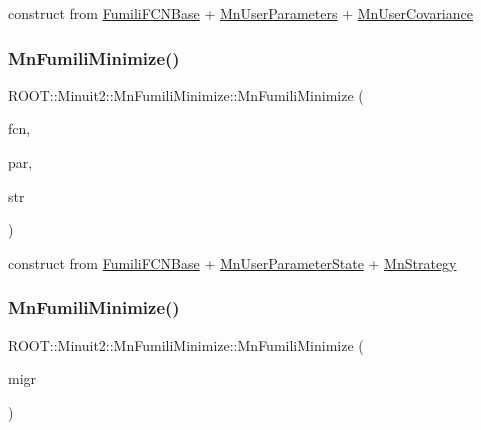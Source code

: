 construct from \mbox{\hyperlink{classROOT_1_1Minuit2_1_1FumiliFCNBase}{Fumili\+F\+C\+N\+Base}} + \mbox{\hyperlink{classROOT_1_1Minuit2_1_1MnUserParameters}{Mn\+User\+Parameters}} + \mbox{\hyperlink{classROOT_1_1Minuit2_1_1MnUserCovariance}{Mn\+User\+Covariance}} 

\mbox{\label{classROOT_1_1Minuit2_1_1MnFumiliMinimize_ad8292150eb4f2642fb583f0cec00ed7b}} 
\subsubsection{\texorpdfstring{MnFumiliMinimize()}{MnFumiliMinimize()}\hspace{0.1cm}{\footnotesize\ttfamily [6/14]}}
{\footnotesize\ttfamily R\+O\+O\+T\+::\+Minuit2\+::\+Mn\+Fumili\+Minimize\+::\+Mn\+Fumili\+Minimize (\begin{DoxyParamCaption}\item[{const \mbox{\hyperlink{classROOT_1_1Minuit2_1_1FumiliFCNBase}{Fumili\+F\+C\+N\+Base}} \&}]{fcn,  }\item[{const \mbox{\hyperlink{classROOT_1_1Minuit2_1_1MnUserParameterState}{Mn\+User\+Parameter\+State}} \&}]{par,  }\item[{const \mbox{\hyperlink{classROOT_1_1Minuit2_1_1MnStrategy}{Mn\+Strategy}} \&}]{str }\end{DoxyParamCaption})\hspace{0.3cm}{\ttfamily [inline]}}



construct from \mbox{\hyperlink{classROOT_1_1Minuit2_1_1FumiliFCNBase}{Fumili\+F\+C\+N\+Base}} + \mbox{\hyperlink{classROOT_1_1Minuit2_1_1MnUserParameterState}{Mn\+User\+Parameter\+State}} + \mbox{\hyperlink{classROOT_1_1Minuit2_1_1MnStrategy}{Mn\+Strategy}} 

\mbox{\label{classROOT_1_1Minuit2_1_1MnFumiliMinimize_a082eb87753b71a4d383ff8d735dc8410}} 
\subsubsection{\texorpdfstring{MnFumiliMinimize()}{MnFumiliMinimize()}\hspace{0.1cm}{\footnotesize\ttfamily [7/14]}}
{\footnotesize\ttfamily R\+O\+O\+T\+::\+Minuit2\+::\+Mn\+Fumili\+Minimize\+::\+Mn\+Fumili\+Minimize (\begin{DoxyParamCaption}\item[{const \mbox{\hyperlink{classROOT_1_1Minuit2_1_1MnFumiliMinimize}{Mn\+Fumili\+Minimize}} \&}]{migr }\end{DoxyParamCaption})\hspace{0.3cm}{\ttfamily [inline]}}

